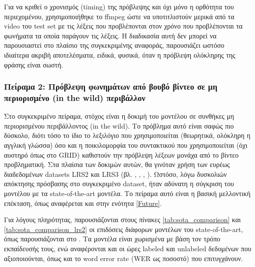 Για να κριθεί ο χρονισμός (timing) της πρόβλεψης και όχι μόνο η ορθότητα του περιεχομένου, χρησιμοποιήθηκε το ffmpeg ώστε να υποτιτλιστούν μερικά από τα video του test set με τις λέξεις που προβλέπονται στον χρόνο που προβλέπονται τα φωνήματα τα οποία παράγουν τις λέξεις. Η διαδικασία αυτή δεν μπορεί να παρουσιαστεί στο πλαίσιο της συγκεκριμένης αναφοράς, παρουσιάζει ωστόσο ιδιαίτερα ακριβή αποτελέσματα, ειδικά, φυσικά, όταν η πρόβλεψη ολόκληρης της φράσης είναι σωστή. 
\subsubsection{Πείραμα 2: Πρόβλεψη φωνημάτων από βουβό βίντεο σε μη περιορισμένο (in the wild) περιβάλλον}
\label{Experiment2}
Στο συγκεκριμένο πείραμα, στόχος είναι η δοκιμή του μοντέλου σε συνθήκες μη περιορισμένου περιβάλλοντος (in the wild). Το πρόβλημα αυτό είναι σαφώς πιο δύσκολο, διότι τόσο το ίδιο το λεξιλόγιο που χρησιμοποιείται (θεωρητικά, ολόκληρη η αγγλική γλώσσα) όσο και η ποικιλομορφία του συντακτικού που χρησιμοποιείται (όχι αυστηρό όπως στο GRID) καθιστούν την πρόβλεψη λέξεων μονάχα από το βίντεο προβληματική. Στα πλαίσια των δοκιμών αυτών, θα γινόταν χρήση των ευρέως διαδεδομένων datasets LRS2 και LRS3 (βλ. \cite{Afouras18c}, \cite{Chung16}, \cite{Chung17}, \cite{Chung17a}). Ωστόσο, λόγω δυσκολιών απόκτησης πρόσβασης στο συγκεκριμένο dataset, ήταν αδύνατη η σύγκριση του μοντέλου με τα state-of-the-art μοντέλα. Το πείραμα αυτό είναι η βασική μελλοντική επέκταση, όπως αναφέρεται και στην ενότητα \ref{Future}.

Για λόγους πληρότητας, παρουσιάζονται στους πίνακες \ref{tab:sota_comparison} και \ref{tab:sota_comparison_lrs2} οι επιδόσεις διάφορων μοντέλων του state-of-the-art, όπως παρουσιάζονται στο \cite{thomas2026vallrvisualasrlanguage}. Τα μοντέλα είναι χωρισμένα με βάση τον τρόπο εκπαίδευσής τους, ενώ αναφέρονται και οι ώρες labeled και unlabeled δεδομένων που αξιοποιούνται, όπως και το word error rate (WER ως ποσοστό) που επιτυγχάνουν.
 
